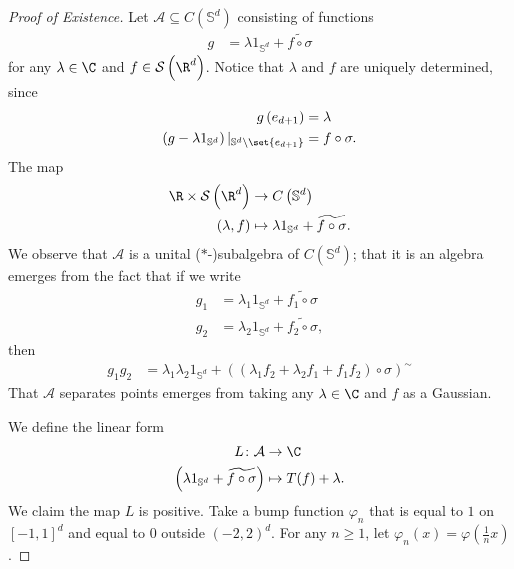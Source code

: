 \documentclass[10pt]{mypackage}
\begin{document}
\begin{proof}[Proof of Existence]
  Let $\mathcal{A}\subseteq C\left( \mathbb{S}^d \right)$ consisting of functions 
  \begin{align*}
    g &= \lambda 1_{ \mathbb{S}^d } + \widetilde{f\circ \sigma}
  \end{align*}
  for any $\lambda\in \C$ and $f\in \mathcal{S}\left( \R^d \right)$. Notice that $\lambda$ and $f$ are uniquely determined, since
  \begin{align*}
    g\left( e_{d+1} \right) &= \lambda\\
    \left( g - \lambda 1_{ \mathbb{S}^d } \right)|_{ \mathbb{S}^d\setminus \set{e_{d+1}} } &= f\circ \sigma.
  \end{align*}
  The map
  \begin{align*}
    \R\times \mathcal{S}\left( \R^d \right) &\to C\left( \mathbb{S}^d \right)\\
    \left( \lambda,f \right) &\mapsto \lambda 1_{ \mathbb{S}^d } + \widetilde{f\circ\sigma}.
  \end{align*}
  We observe that $ \mathcal{A} $ is a unital ($\ast$-)subalgebra of $C\left( \mathbb{S}^d \right)$; that it is an algebra emerges from the fact that if we write
  \begin{align*}
    g_1 &= \lambda_1 1_{ \mathbb{S}^d } + \widetilde{f_1\circ\sigma}\\
    g_2 &= \lambda_2 1_{ \mathbb{S}^d } + \widetilde{f_2\circ\sigma},
  \end{align*}
  then
  \begin{align*}
    g_1g_2 &= \lambda_1\lambda_2 1_{ \mathbb{S}^d } + \left( \left( \lambda_1 f_2 + \lambda_2 f_1 + f_1f_2 \right)\circ\sigma \right)^{\sim}
  \end{align*}
  That $ \mathcal{A} $ separates points emerges from taking any $\lambda\in \C$ and $f$ as a Gaussian.

  We define the linear form
  \begin{align*}
    L \colon \mathcal{A} &\to \C\\
    \left( \lambda 1_{ \mathbb{S}^d } + \widetilde{f\circ\sigma}\right) &\mapsto T(f) + \lambda.
  \end{align*}
  We claim the map $L$ is positive. Take a bump function $\varphi_n$ that is equal to $1$ on $\left[ -1,1 \right]^{d}$ and equal to $0$ outside $\left( -2,2 \right)^{d}$. For any $n\geq 1$, let $\varphi_n(x) = \varphi\left( \frac{1}{n}x \right)$.


\end{proof}
\end{document}
